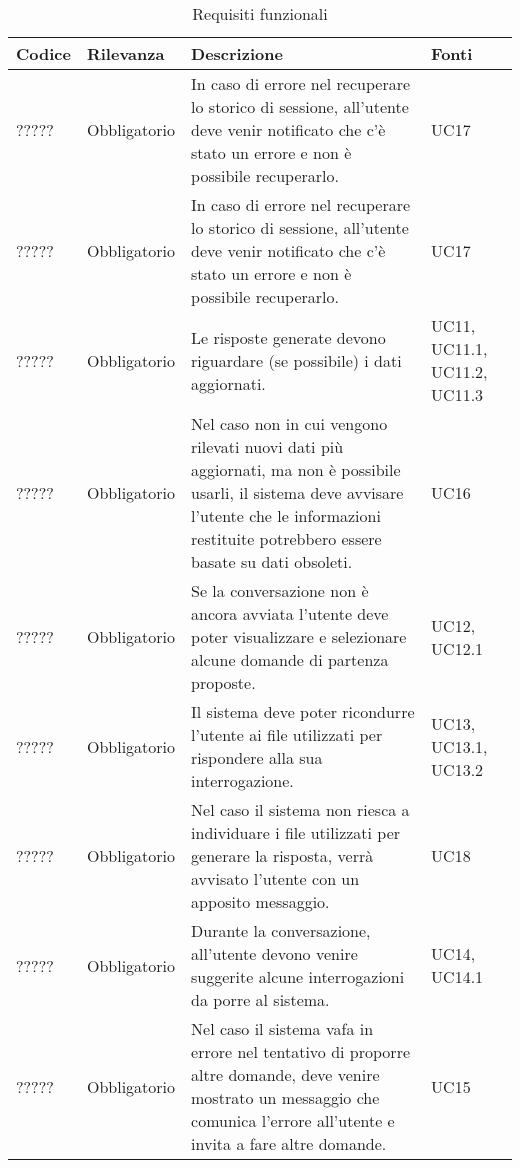     \vspace{0.5cm}
    \newpage
    \begin{table}[h!]
        \renewcommand{\arraystretch}{1.6} %
        \begin{tabularx}{\textwidth}{|p{2cm}|p{3cm}|X|p{4cm}|} \hline
        \rowcolor[HTML]{FFD700} 
        \textbf{Codice} & \textbf{Rilevanza} & \textbf{Descrizione} & \textbf{Fonti} \\ \hline
        ????? & Obbligatorio & In caso di errore nel recuperare lo storico di sessione, all'utente deve venir notificato che c'è stato un errore e non è possibile recuperarlo. & UC17 \\ \hline
        ????? & Obbligatorio & In caso di errore nel recuperare lo storico di sessione, all'utente deve venir notificato che c'è stato un errore e non è possibile recuperarlo. & UC17 \\ \hline
    ????? & Obbligatorio & Le risposte generate devono riguardare (se possibile) i dati aggiornati. & UC11, UC11.1, UC11.2, UC11.3 \\ \hline
    ????? & Obbligatorio & Nel caso non in cui vengono rilevati nuovi dati più aggiornati, ma non è possibile usarli, il sistema deve avvisare l'utente che le informazioni restituite potrebbero essere basate su dati obsoleti. & UC16 \\ \hline
    ????? & Obbligatorio & Se la conversazione non è ancora avviata l'utente deve poter visualizzare e selezionare alcune domande di partenza proposte. & UC12, UC12.1 \\ \hline
    ????? & Obbligatorio & Il sistema deve poter ricondurre l'utente ai file utilizzati per rispondere alla sua interrogazione. & UC13, UC13.1, UC13.2 \\ \hline
    ????? & Obbligatorio & Nel caso il sistema non riesca a individuare i file utilizzati per generare la risposta, verrà avvisato l'utente con un apposito messaggio. & UC18 \\ \hline
    ????? & Obbligatorio & Durante la conversazione, all'utente devono venire suggerite alcune interrogazioni da porre al sistema. & UC14, UC14.1 \\ \hline
    ????? & Obbligatorio & Nel caso il sistema vafa in errore nel tentativo di proporre altre domande, deve venire mostrato un messaggio che comunica l'errore all'utente e invita a fare altre domande. & UC15 \\ \hline
    \end{tabularx}

    \caption{Requisiti funzionali}
    \label{tab:Requisiti_funzionali}
\end{table}

